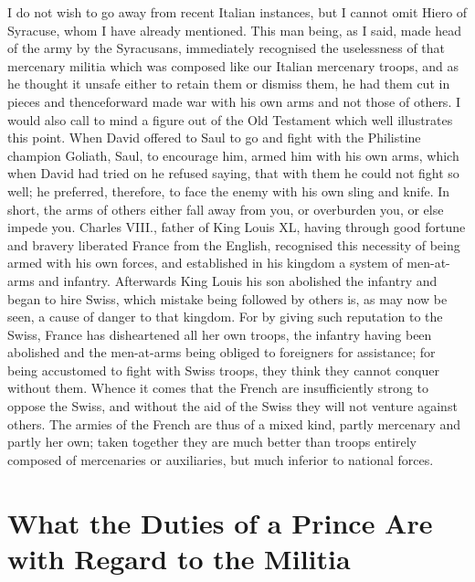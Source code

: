 \documentclass[12pt,letterpaper]{memoir}
\begin{document}
I do not wish to go away from recent Italian instances, but I cannot
omit Hiero of Syracuse, whom I have already mentioned. This man being,
as I said, made head of the army by the Syracusans, immediately
recognised the uselessness of that mercenary militia which was composed
like our Italian mercenary troops, and as he thought it unsafe
either to retain them or dismiss them, he had them cut in pieces and
thenceforward made war with his own arms and not those of others. I
would also call to mind a figure out of the Old Testament which well
illustrates this point. When David offered to Saul to go and fight with
the Philistine champion Goliath, Saul, to encourage him, armed him
with his own arms, which when David had tried on he refused saying,
that with them he could not fight so well; he preferred, therefore,
to face the enemy with his own sling and knife. In short, the arms of
others either fall away from you, or overburden you, or else impede
you. Charles VIII., father of King Louis XL, having through good
fortune and bravery liberated France from the English, recognised this
necessity of being armed with his own forces, and established in his
kingdom a system of men-at-arms and infantry. Afterwards King Louis
his son abolished the infantry and began to hire Swiss, which mistake
being followed by others is, as may now be seen, a cause of danger to
that kingdom. For by giving such reputation to the Swiss, France has
disheartened all her own troops, the infantry having been abolished and
the men-at-arms being obliged to foreigners for assistance; for being
accustomed to fight with Swiss troops, they think they cannot conquer
without them. Whence it comes that the French are insufficiently strong
to oppose the Swiss, and without the aid of the Swiss they will not
venture against others. The armies of the French are thus of a mixed
kind, partly mercenary and partly her own; taken together they are much
better than troops entirely composed of mercenaries or auxiliaries, but
much inferior to national forces.

\chapter{What the Duties of a Prince Are with Regard to the Militia}
\end{document}
